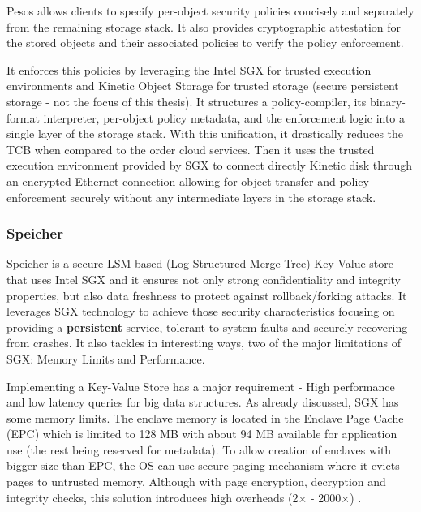 Pesos allows clients to specify per-object security policies concisely and separately from the remaining storage stack. It also provides cryptographic attestation for the stored objects and their associated policies to verify the policy enforcement.

It enforces this policies by leveraging the Intel \gls{SGX} for trusted execution environments and Kinetic Object Storage \cite{kinetic:1} for trusted storage (secure persistent storage - not the focus of this thesis). It structures a policy-compiler, its binary-format interpreter, per-object policy metadata, and the enforcement logic into a single layer of the storage stack. With this unification, it drastically reduces the \gls{TCB} when compared to the order cloud services. Then it uses the trusted execution environment provided by \gls{SGX} to connect directly Kinetic disk through an encrypted Ethernet connection allowing for object transfer and policy enforcement securely without any intermediate layers in the storage stack.

\subsubsection{Speicher}
\label{sssec:speicher}

Speicher \cite{speicher:1} is a secure \gls{LSM}-based (Log-Structured Merge Tree) Key-Value store that uses Intel \gls{SGX} and it ensures not only strong confidentiality and integrity properties, but also data freshness to protect against rollback/forking attacks. It leverages \gls{SGX} technology to achieve those security characteristics focusing on providing a \textbf{persistent} service, tolerant to system faults and securely recovering from crashes. It also tackles in interesting ways, two of the major limitations of \gls{SGX}: Memory Limits and Performance.

Implementing a Key-Value Store has a major requirement - High performance and low latency queries for big data structures. As already discussed, \gls{SGX} has some memory limits. The enclave memory is located in the Enclave Page Cache (\gls{EPC}) which is limited to 128 \gls{MB} with about 94 \gls{MB} available for application use (the rest being reserved for metadata). To allow creation of enclaves with bigger size than \gls{EPC}, the \gls{OS}  can use secure paging mechanism where it evicts pages to untrusted memory. Although with page encryption, decryption and integrity checks, this solution introduces high overheads (2× - 2000×) \cite{scone:1}.

